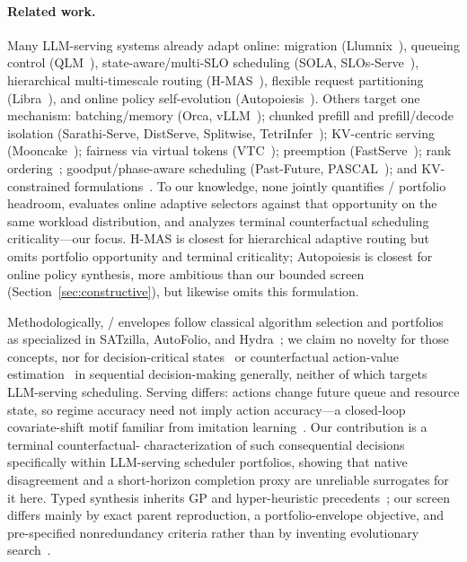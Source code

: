 \documentclass[runningheads]{llncs}
\begin{document}
\paragraph{Related work.}
Many LLM-serving systems already adapt online: migration
(Llumnix~\cite{llumnix2024}), queueing control (QLM~\cite{qlm2024}),
state-aware/multi-SLO scheduling (SOLA, SLOs-Serve~\cite{sola2025,slosserve2025}),
hierarchical multi-timescale routing (H-MAS~\cite{hmas2026}), flexible request
partitioning (Libra~\cite{libra2026}), and online policy self-evolution
(Autopoiesis~\cite{autopoiesis2026}). Others target one mechanism:
batching/memory (Orca, vLLM~\cite{orca2022,vllm2023}); chunked prefill and
prefill/decode isolation (Sarathi-Serve, DistServe, Splitwise,
TetriInfer~\cite{sarathi2024,distserve2024,splitwise2024,tetriinfer2024});
KV-centric serving (Mooncake~\cite{mooncake2025}); fairness via virtual
tokens (VTC~\cite{vtc2024}); preemption (FastServe~\cite{fastserve2026});
rank ordering~\cite{llmltr2024}; goodput/phase-aware scheduling (Past-Future,
PASCAL~\cite{pastfuture2025,pascal2026}); and KV-constrained
formulations~\cite{kvscheduling2025,wait2025}. To our knowledge, none jointly
quantifies \sbs{}/\vbs{} portfolio headroom, evaluates online adaptive
selectors against that opportunity on the same workload distribution, and
analyzes terminal counterfactual scheduling criticality---our focus. H-MAS is
closest for hierarchical adaptive routing but omits portfolio opportunity and
terminal criticality; Autopoiesis is closest for online policy synthesis,
more ambitious than our bounded screen (Section~\ref{sec:constructive}), but
likewise omits this formulation.

Methodologically, \sbs{}/\vbs{} envelopes follow classical algorithm selection
and portfolios~\cite{rice1976algorithmselection,gomes2001portfolios,satzilla2008}
as specialized in SATzilla, AutoFolio, and Hydra~\cite{autofolio2015,hydra2010};
we claim no novelty for those concepts, nor for decision-critical
states~\cite{karino2020criticalstates} or counterfactual action-value
estimation~\cite{mesnard2021counterfactual} in sequential decision-making
generally, neither of which targets LLM-serving scheduling. Serving differs:
actions change future queue and
resource state, so regime accuracy need not imply action accuracy---a
closed-loop covariate-shift motif familiar from imitation
learning~\cite{ross2011dagger}. Our contribution is a
terminal counterfactual-\anwg{} characterization of such
consequential decisions specifically within LLM-serving scheduler portfolios,
showing that native disagreement and a short-horizon completion proxy are
unreliable surrogates for it here. Typed synthesis inherits GP and
hyper-heuristic precedents~\cite{koza1992gp,montana1995stgp,whigham1995grammar,branke2015hyperheuristic};
our screen differs mainly by exact parent reproduction, a portfolio-envelope
objective, and pre-specified nonredundancy criteria rather than by inventing
evolutionary search~\cite{funsearch2024,autopoiesis2026}.
\end{document}
